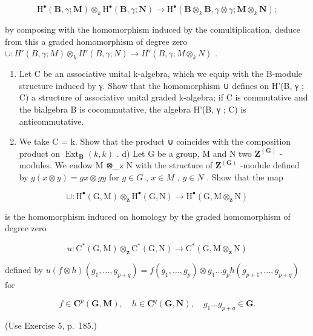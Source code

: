 \[
\mathrm{H} ^ {\bullet} (\mathbf {B}, \gamma ; \mathbf {M}) \otimes_ {k} \mathrm{H} ^ {\bullet} (\mathbf {B}, \gamma ; \mathbf {N}) \rightarrow \mathrm{H} ^ {\bullet} (\mathbf {B} \otimes_ {k} \mathbf {B}, \gamma \otimes \gamma ; \mathbf {M} \otimes_ {k} \mathbf {N});
\]

by composing with the homomorphism induced by the comultiplication, deduce from this a graded homomorphism of degree zero \(\cup: H'(B, \gamma; M) \otimes_k H'(B, \gamma; N) \to H'(B, \gamma; M \otimes_k N)\) .

\begin{enumerate}
\def\labelenumi{\alph{enumi})}
\setcounter{enumi}{1}
\item
  Let C be an associative unital k-algebra, which we equip with the B-module structure induced by γ. Show that the homomorphism ∪ defines on H'(B, γ ; C) a structure of associative unital graded k-algebra; if C is commutative and the bialgebra B is cocommutative, the algebra H'(B, γ ; C) is anticommutative.
\item
  We take C = k. Show that the product ∪ coincides with the composition product on \(\operatorname{Ext}_{\mathbf{B}}(k, k)\) . d) Let G be a group, M and N two \(\mathbf{Z}^{(\mathbf{G})}\) -modules. We endow M ⊗\_z N with the structure of \(\mathbf{Z}^{(\mathbf{G})}\) -module defined by \(g(x \otimes y) = gx \otimes gy\) for \(g \in G\) , \(x \in M\) , \(y \in N\) . Show that the map
\end{enumerate}

\[
\cup : \mathrm{H} ^ {\bullet} (\mathrm{G}, \mathrm{M}) \otimes_ {\mathbf {z}} \mathrm{H} ^ {\bullet} (\mathrm{G}, \mathrm{N}) \rightarrow \mathrm{H} ^ {\bullet} (\mathrm{G}, \mathrm{M} \otimes_ {\mathbf {z}} \mathrm{N})
\]

is the homomorphism induced on homology by the graded homomorphism of degree zero

\[
u: \mathrm{C} ^ {*} (\mathrm{G}, \mathrm{M}) \otimes_ {\mathbf {z}} \mathrm{C} ^ {*} (\mathrm{G}, \mathrm{N}) \rightarrow \mathrm{C} ^ {*} (\mathrm{G}, \mathrm{M} \otimes_ {\mathbf {z}} \mathrm{N})
\]

defined by \(u(f \otimes h)(g_1, \ldots, g_{p+q}) = f(g_1, \ldots, g_p) \otimes g_1 \ldots g_p h(g_{p+1}, \ldots, g_{p+q})\) for

\[
f \in \mathbf {C} ^ {p} (\mathbf {G}, \mathbf {M}), \quad h \in \mathbf {C} ^ {q} (\mathbf {G}, \mathbf {N}), \quad g _ {1} \dots g _ {p + q} \in \mathbf {G}.
\]

(Use Exercise 5, p.~185.)

